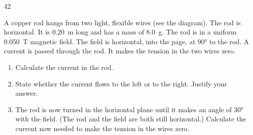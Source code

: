 \begin{practiceq}{4}{2}\label{pq:rod}
\begin{sidebyside}[0.40]
  \centering
\nextside
A copper rod hangs from two light, flexible wires (see the diagram). The rod is horizontal.
It is \qty{0.20}{m} long and has a mass of \qty{8.0}{g}. The rod is in a uniform
\qty{0.050}{T} magnetic field. The field is horizontal, into the page, at \ang{90} to the
rod. A current is passed through the rod. It makes the tension in the two wires zero.
\end{sidebyside}
\begin{enumerate}[label=(\alph*)]
  \item Calculate the current in the rod. 
  \item State whether the current flows to the left or to the right. Justify your answer.
  \item The rod is now turned in the horizontal plane until it makes an angle of \ang{30}
        with the field. (The rod and the field are both still horizontal.) Calculate the
        current now needed to make the tension in the wires zero. 
\end{enumerate}
\end{practiceq}

